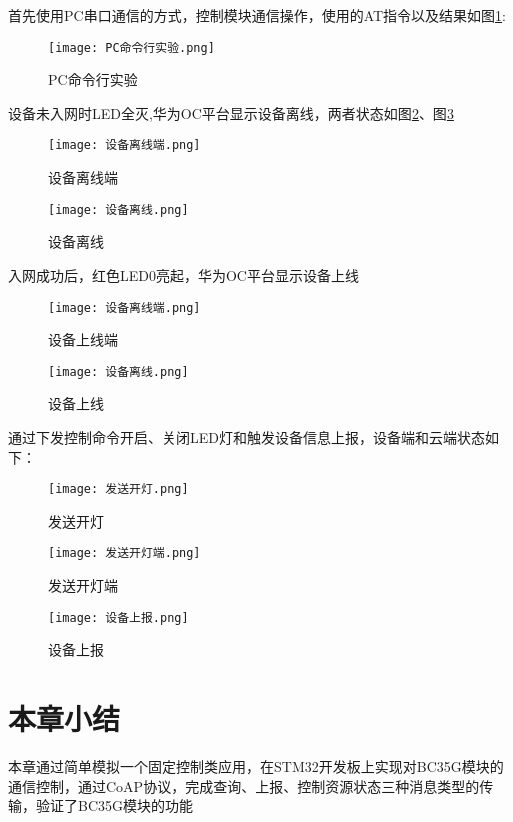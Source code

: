 首先使用PC串口通信的方式，控制模块通信操作，使用的AT指令以及结果如图\ref{PC命令行实验}:


\begin{figure}[H]
    \centering
	\texttt{[image: PC命令行实验.png]}
	\caption{PC命令行实验}
	\label{PC命令行实验}
\end{figure}

设备未入网时LED全灭,华为OC平台显示设备离线，两者状态如图\ref{设备离线端}、图\ref{设备离线}

\begin{figure}[H]
    \centering
	\texttt{[image: 设备离线端.png]}
	\caption{设备离线端}
	\label{设备离线端}
\end{figure}


\begin{figure}[H]
    \centering
	\texttt{[image: 设备离线.png]}
	\caption{设备离线}
	\label{设备离线}
\end{figure}

入网成功后，红色LED0亮起，华为OC平台显示设备上线
\begin{figure}[H]
    \centering
	\texttt{[image: 设备离线端.png]}
	\caption{设备上线端}
	\label{设备上线端}
\end{figure}


\begin{figure}[H]
    \centering
	\texttt{[image: 设备离线.png]}
	\caption{设备上线}
	\label{设备上线}
\end{figure}

通过下发控制命令开启、关闭LED灯和触发设备信息上报，设备端和云端状态如下：
\begin{figure}[H]
    \centering
	\texttt{[image: 发送开灯.png]}
	\caption{发送开灯}
	\label{发送开灯}
\end{figure}


\begin{figure}[H]
    \centering
	\texttt{[image: 发送开灯端.png]}
	\caption{发送开灯端}
	\label{发送开灯端}

\end{figure}\begin{figure}[H]
    \centering
	\texttt{[image: 设备上报.png]}
	\caption{设备上报}
	\label{设备上报}
\end{figure}

\section{本章小结}

本章通过简单模拟一个固定控制类应用，在STM32开发板上实现对BC35G模块的通信控制，通过CoAP协议，完成查询、上报、控制资源状态三种消息类型的传输，验证了BC35G模块的功能